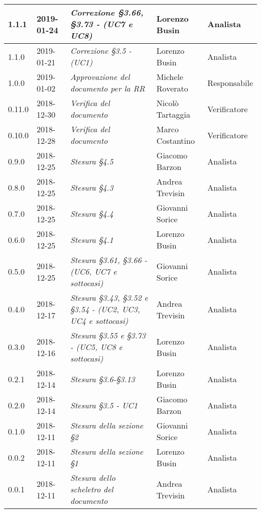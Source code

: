\begin{longtable}{C{2cm}|C{2.5cm}|C{4.5cm}|C{2.5cm}|C{3cm}}
		1.1.1 & 2019-01-24 & \emph{Correzione §3.66, §3.73 - (UC7 e UC8)} & Lorenzo Busin & Analista \\
		\hline	
	
		1.1.0 & 2019-01-21 & \emph{Correzione §3.5 - (UC1)} & Lorenzo Busin & Analista \\
		\hline
		
		1.0.0 & 2019-01-02 & \emph{Approvazione del documento per la RR} & Michele Roverato & Responsabile \\
		\hline
		
		0.11.0 & 2018-12-30 & \emph{Verifica del documento} & Nicolò Tartaggia & Verificatore \\
		\hline
		
		0.10.0 & 2018-12-28 & \emph{Verifica del documento} & Marco Costantino & Verificatore \\
		\hline
		
		0.9.0 & 2018-12-25 & \emph{Stesura §4.5} & Giacomo Barzon & Analista \\
		\hline
		
		0.8.0 & 2018-12-25 & \emph{Stesura §4.3} & Andrea Trevisin & Analista \\
		\hline
		
		0.7.0 & 2018-12-25 & \emph{Stesura §4.4} & Giovanni Sorice & Analista \\
		\hline
		
		0.6.0 & 2018-12-25 & \emph{Stesura §4.1} & Lorenzo Busin & Analista \\
		\hline
		
		0.5.0 & 2018-12-25 & \emph{Stesura §3.61, §3.66 - (UC6, UC7 e sottocasi)} & Giovanni Sorice & Analista \\
		\hline
		
		0.4.0 & 2018-12-17 & \emph{Stesura §3.43, §3.52 e §3.54 - (UC2, UC3, UC4 e sottocasi)} & Andrea Trevisin & Analista \\
		\hline
		
		0.3.0 & 2018-12-16 & \emph{Stesura §3.55 e §3.73 - (UC5, UC8 e sottocasi)} & Lorenzo Busin & Analista \\
		\hline
		
		0.2.1 & 2018-12-14 & \emph{Stesura §3.6-§3.13} & Lorenzo Busin & Analista \\
		\hline
		
		0.2.0 & 2018-12-14 & \emph{Stesura §3.5 - UC1} & Giacomo Barzon & Analista \\
		\hline
		
		0.1.0 & 2018-12-11 & \emph{Stesura della sezione §2} & Giovanni Sorice & Analista \\
		\hline
		
		0.0.2 & 2018-12-11 & \emph{Stesura della sezione §1} & Lorenzo Busin & Analista \\
		\hline
		
		0.0.1 & 2018-12-11 & \emph{Stesura dello scheletro del documento} & Andrea Trevisin & Analista \\
		
	\end{longtable}



\clearpage